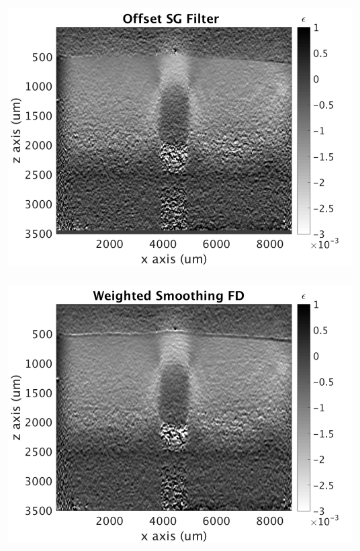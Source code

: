 \begin{figure}[h]
\begin{subfigure}{0.49\textwidth}
        \includegraphics[width=\textwidth]{appendix_figs/posg_fr40_lr40.png}
    \end{subfigure}
    \begin{subfigure}{0.49\textwidth}
    	\centering
        \includegraphics[width=\textwidth]{appendix_figs/wfd_fr40_lr40.png}
    \end{subfigure}
    \\
    \begin{subfigure}{0.49\textwidth}
    	\centering

\end{subfigure}
\end{figure}
